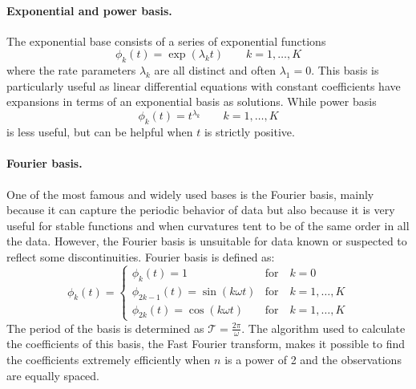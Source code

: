 \paragraph{Exponential and power basis.} The exponential base consists of a series of exponential functions 
\begin{equation}
    \label{eq:exponential}
    \phi_k(t)=\exp (\lambda_kt) \qquad k=1,\dots, K
\end{equation}
where the rate parameters $\lambda_k$ are all distinct and often $\lambda_1=0$. This basis is particularly useful as linear differential equations with constant coefficients have expansions in terms of an exponential basis as solutions. While power basis
\begin{equation}
    \label{eq:power}
    \phi_k(t)=t^{\lambda_k} \qquad k=1,\dots, K
\end{equation}
is less useful, but can be helpful when $t$ is strictly positive.
\paragraph{Fourier basis.} One of the most famous and widely used bases is the Fourier basis, mainly because it can capture the periodic behavior of data but also because it is very useful for stable functions and when curvatures tent to be of the same order in all the data. However, the Fourier basis is unsuitable for data known or suspected to reflect some discontinuities. Fourier basis is defined as:
\begin{equation}
    \label{eq:fourier}
    \phi_k(t)=\left\{ \begin{array}{ll}
         \phi_k(t)=1 & \text{for} \quad k = 0 \\
         \phi_{2k-1}(t)= \sin(k\omega t) & \text{for} \quad k = 1, \dots, K \\
         \phi_{2k}(t)= \cos(k\omega t) & \text{for} \quad k = 1, \dots, K
    \end{array}\right.
\end{equation}
The period of the basis is determined as $\mathcal{T}=\frac{2\pi}{\omega}$. The algorithm used to calculate the coefficients of this basis, the Fast Fourier transform, makes it possible to find the coefficients extremely efficiently when $n$ is a power of 2 and the observations are equally spaced.
